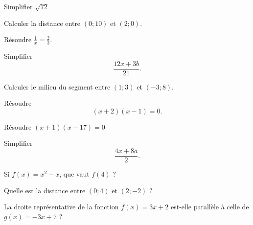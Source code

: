 \begin{MentalActivity}

\begin{mental}
            Simplifier \( \sqrt{72}\)
\end{mental}

\begin{mental}
            Calculer la distance entre \( (0;10)\) et \( (2;0)\).
\end{mental}

\begin{mental}
            Résoudre \( \frac{1}{ x }=\frac{ 2 }{ 3 }\).
\end{mental}

\begin{mental}
            Simplifier 
            \begin{equation*}
                \frac{ 12x+3b }{ 21 }.
            \end{equation*}
\end{mental}

\begin{mental}
            Calculer le milieu du segment entre \( (1;3)\) et \( (-3;8)\).
\end{mental}

\begin{mental}
            Résoudre
            \begin{equation*}
                (x+2)(x-1)=0.
            \end{equation*}
\end{mental}


\end{MentalActivity}
\begin{MentalActivity}

\begin{mental}
            Résoudre \( (x+1)(x-17)=0\)
\end{mental}

\begin{mental}
            Simplifier
            \begin{equation}
                \frac{ 4x+8a }{ 2 }.
            \end{equation}
\end{mental}

\begin{mental}
            Si \( f(x)=x^2-x\), que vaut \( f(4)\) ?
\end{mental}

\begin{mental}
            Quelle est la distance entre \( (0;4)\) et \( (2;-2)\) ?
\end{mental}

\begin{mental}
            La droite représentative de la fonction \( f(x)=3x+2\) est-elle parallèle à celle de \( g(x)=-3x+7\) ?

\end{mental}


\end{MentalActivity}
